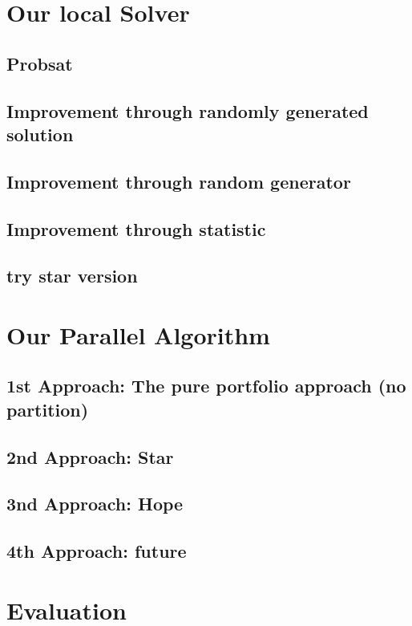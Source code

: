 \documentclass[12pt,a4paper,twoside]{scrartcl}
\numberwithin{equation}{section}
\begin{document}
\section{Our local Solver}
\label{sec:Solving GCP by Tabucol}
\subsection{Probsat}
\subsection{Improvement through randomly generated solution}
\label{subsec:Improvement through Bias initialization}
\label{double choose (greedy and sls)}
\label{subsec:Improvement through Tabu}
\subsection{Improvement through random generator}
\subsection{Improvement through statistic}
\subsection{try star version}

\section{Our Parallel Algorithm}
\label{sec:Our parallel Algorithm}
\subsection{1st Approach: The pure portfolio approach (no partition)}
\subsection{2nd Approach: Star}
\subsection{3nd Approach: Hope}
\subsection{4th Approach: future}
\section{Evaluation} 
\end{document}
